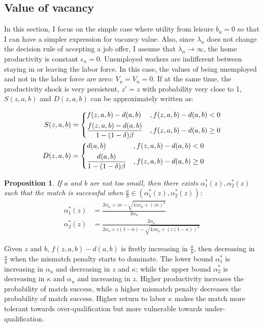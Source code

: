 \documentclass[12pt]{article}
\newtheorem{proposition}{Proposition}
\newcommand{\1}{\mathbb{1}}
\begin{document}
\subsection{Value of vacancy}
In this section, I focus on the simple case where utility from leisure $b_u = 0$ so that I can have a simpler expression for vacancy value. Also, since $\lambda_n$ does not change the decision rule of accepting a job offer, I assume that $\lambda_n \to \infty$, the home productivity is constant $\epsilon_n = 0$. Unemployed workers are indifferent between staying in or leaving the labor force. In this case, the values of being unemployed and not in the labor force are zero: $V_u = V_n = 0$. If at the same time, the productivity shock is very persistent, $z' = z$ with probability very close to 1, $S(z,a,b)$ and $D(z,a,b)$ can be approximately written as: 

\begin{align*}
S(z,a,b) &= 
\begin{dcases}
f(z,a,b)-d(a,b) &, f(z,a,b)-d(a,b)<0\\
\frac{f(z,a,b)-d(a,b)}{1-(1-\delta)\beta} &,  f(z,a,b)-d(a,b) \geq 0 \\
\end{dcases}\\
D(z,a,b) &= 
\begin{dcases}
d(a,b)&, f(z,a,b)-d(a,b)<0\\
\frac{d(a,b)}{1-(1-\delta)\beta} &,  f(z,a,b)-d(a,b) \geq 0 \\
\end{dcases}
\end{align*}

\begin{proposition}
If $a$ and $b$ are not too small, then there exists $\alpha_1^*(z), \alpha_2^*(z)$ such that the match is successful when $\frac{a}{b}\in(\alpha_1^*(z),\alpha_2^*(z))$:
\begin{align*}
\alpha_1^*(z) &= \frac{2\alpha_u+z\kappa-\sqrt{4z\alpha_u+(z\kappa)^2}}{2\alpha_u} \\
\alpha_2^*(z) &=\frac{2\alpha_o}{2\alpha_o+z(1-\kappa)-\sqrt{4z\alpha_o+(z(1-\kappa))^2}} 
\end{align*}
\end{proposition}
Given $z$ and $b$, $f(z,a,b)-d(a,b)$ is firstly increasing in $\frac{a}{b}$, then decreasing in $\frac{a}{b}$ when the mismatch penalty starts to dominate. The lower bound $\alpha_1^*$ is increasing in $\alpha_u$ and decreasing in $z$ and $\kappa$; while the upper bound $\alpha_2^*$ is decreasing in $\kappa$ and $\alpha_u$ and increasing in $z$. Higher productivity increases the probability of match success, while a higher mismatch penalty decreases the probability of match success. Higher return to labor $\kappa$ makes the match more tolerant towards over-qualification but more vulnerable towards under-qualification. 
\end{document}
